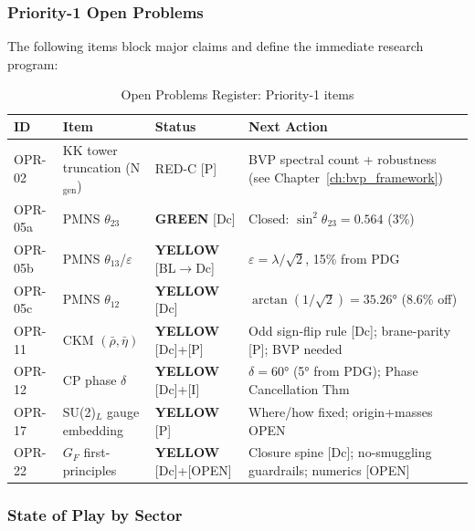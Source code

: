 \subsubsection{Priority-1 Open Problems}

The following items block major claims and define the immediate research program:

\begin{table}[ht]
\centering
\caption{Open Problems Register: Priority-1 items}
\label{tab:opr_p1}
\small\begin{tabular}{@{}lp{4cm}lp{4cm}@{}}
\toprule
\textbf{ID} & \textbf{Item} & \textbf{Status} & \textbf{Next Action} \\
\midrule
OPR-02 & KK tower truncation (N$_{\text{gen}}$) & RED-C [P] & BVP spectral count + robustness (see Chapter~\ref{ch:bvp_framework}) \\
OPR-05a & PMNS $\theta_{23}$ & \textcolor{OliveGreen}{\textbf{GREEN}} [Dc] & Closed: $\sin^2\theta_{23} = 0.564$ (3\%) \\
OPR-05b & PMNS $\theta_{13}$/$\varepsilon$ & \textcolor{YellowOrange}{\textbf{YELLOW}} [BL$\to$Dc] & $\varepsilon = \lambda/\sqrt{2}$, 15\% from PDG \\
OPR-05c & PMNS $\theta_{12}$ & \textcolor{YellowOrange}{\textbf{YELLOW}} [Dc] & $\arctan(1/\sqrt{2}) = 35.26°$ (8.6\% off) \\
OPR-11 & CKM $(\bar\rho, \bar\eta)$ & \textcolor{YellowOrange}{\textbf{YELLOW}} [Dc]+[P] & Odd sign-flip rule [Dc]; brane-parity [P]; BVP needed \\
OPR-12 & CP phase $\delta$ & \textcolor{YellowOrange}{\textbf{YELLOW}} [Dc]+[I] & $\delta = 60°$ (5° from PDG); Phase Cancellation Thm \\
OPR-17 & SU(2)$_L$ gauge embedding & \textcolor{YellowOrange}{\textbf{YELLOW}} [P] & Where/how fixed; origin+masses OPEN \\
OPR-22 & $G_F$ first-principles & \textcolor{YellowOrange}{\textbf{YELLOW}} [Dc]+[OPEN] & Closure spine [Dc]; no-smuggling guardrails; numerics [OPEN] \\
\bottomrule
\end{tabular}
\end{table}

\subsubsection{State of Play by Sector}

